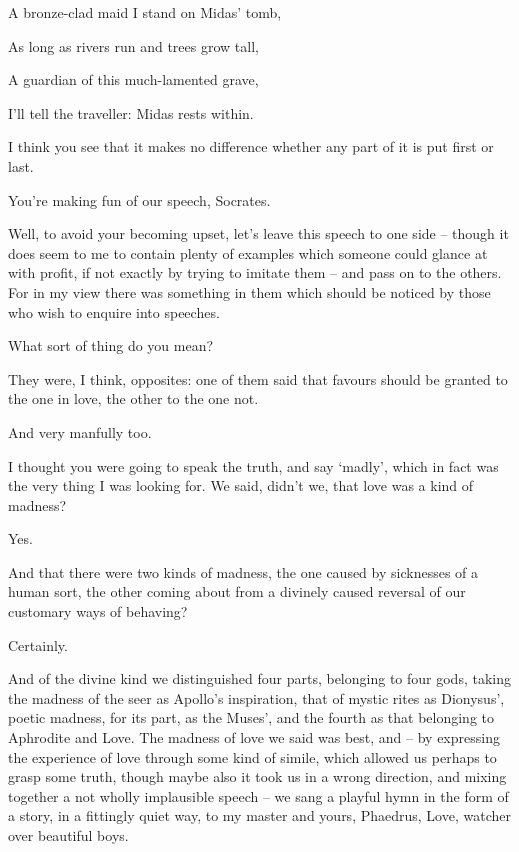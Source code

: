 A bronze-clad maid I stand on Midas' tomb,

As long as rivers run and trees grow tall,

A guardian of this much-lamented grave, 

I'll tell the traveller: Midas rests within.

I think you see that it makes no difference whether any part of 
it is put first or last.

You're making fun of our speech, Socrates.

Well, to avoid your becoming upset, let's leave this speech to
one side -- though it does seem to me to contain plenty  of
examples which someone could glance at with profit, if not exactly by
trying to imitate them -- and pass on to the others. For in my view
there was something in them which should be noticed by those who wish to
enquire into speeches.

What sort of thing do you mean? 

They were, I think, opposites: one of them said that favours
should be granted to the one in love, the other to the one not.

And very manfully too.

I thought you were going to speak the truth, and  say
‘madly', which in fact was the very thing I was looking for. We said,
didn't we, that love was a kind of madness?

Yes.

And that there were two kinds of madness, the one caused by
sicknesses of a human sort, the other coming about  from a
divinely caused reversal of our customary ways of behaving?

Certainly. 

And of the divine kind we distinguished four parts, belonging
to four gods, taking the madness of the seer as Apollo's inspiration,
that of mystic rites as Dionysus', poetic madness, for its part, as the
Muses', and the fourth as that belonging to Aphrodite and Love. The
madness of love we said  was best, and -- by expressing the
experience of love through some kind of simile, which allowed us perhaps
to grasp some truth, though maybe also it took us in a wrong direction,
and  mixing together a not wholly implausible speech -- we sang
a playful hymn in the form of a story, in a fittingly quiet way, to my
master and yours, Phaedrus, Love, watcher over beautiful boys.

